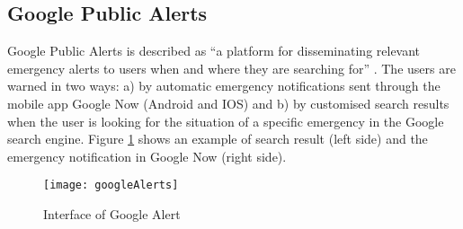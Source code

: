 \subsection*{Google Public Alerts}

Google Public Alerts is described as “a platform for disseminating relevant emergency alerts to users when and where they are searching for” \cite{googleAlerts}. The users are warned in two ways: a) by automatic emergency notifications sent through the mobile app Google Now (Android and IOS) and b) by customised search results when the user is looking for the situation of a specific emergency in the Google search engine. Figure \ref{fig:googleAlert} shows an example of search result (left side) and the emergency notification in Google Now (right side).

\begin{figure}[]
\begin{center}
  \texttt{[image: googleAlerts]}
\caption{Interface of Google Alert}
\label{fig:googleAlert}
\end{center}
\end{figure}





